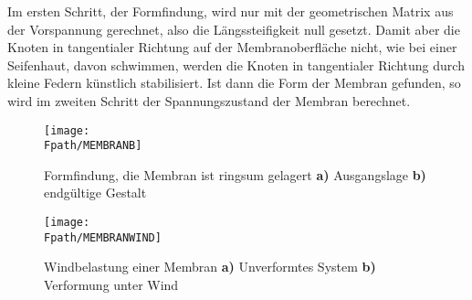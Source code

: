 Im ersten Schritt, der Formfindung, wird nur mit der geometrischen Matrix aus der Vorspannung gerechnet, also die L\"{a}ngssteifigkeit null gesetzt. Damit aber die Knoten in tangentialer Richtung auf der Membranoberfl\"{a}che nicht, wie bei einer Seifenhaut, davon schwimmen, werden die Knoten in tangentialer Richtung durch kleine Federn k\"{u}nstlich stabilisiert. Ist dann die Form der Membran gefunden, so wird im zweiten Schritt der Spannungszustand der Membran berechnet.
\begin{figure}[tbp] \centering
\if {} \sidecaption \fi
\texttt{[image: \\Fpath/MEMBRANB]}
\caption{Formfindung, die Membran ist ringsum gelagert {\bf a)} Ausgangslage {\bf b)}
endg\"{u}ltige Gestalt}  \label{MembranB}
\end{figure}%
\begin{figure}[tbp] \centering
\if {} \sidecaption \fi
\texttt{[image: \\Fpath/MEMBRANWIND]}
\caption{Windbelastung einer Membran {\bf a)} Unverformtes System {\bf b)}
Verformung unter Wind}  \label{MembranWind}
\end{figure}%

